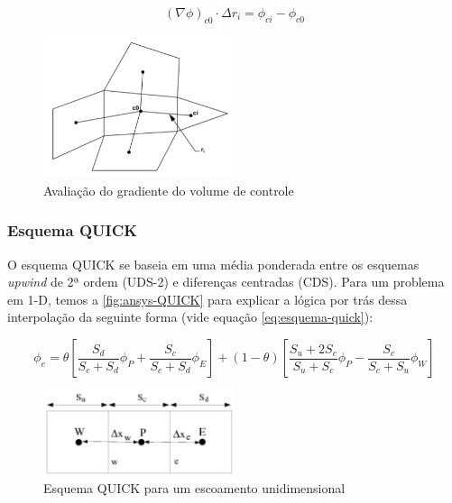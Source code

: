 \begin{equation} \label{eq:gradiente-minimos-quadrados}
    \left(\nabla\phi\right)_{c0} \cdot \Delta r_i = \phi_{ci} - \phi_{c0}
\end{equation}

\begin{figure}[!ht]
	\centering
	\includegraphics[width=0.5\textwidth]{foto02-minimos-quadrados.png}
	\caption{Avaliação do gradiente do volume de controle \cite{fluent2021ansys}}
	\label{fig:minimos-quadrados}
\end{figure}
 
\subsubsection{Esquema QUICK}

O esquema QUICK \cite{Leonard1990} se baseia em uma média ponderada entre os esquemas \textit{upwind} de 2ª ordem (UDS-2) e diferenças centradas (CDS). Para um problema em 1-D, temos a \autoref{fig:ansys-QUICK} para explicar a lógica por trás dessa interpolação da seguinte forma (vide equação \ref{eq:esquema-quick}):

\begin{equation}
	\label{eq:esquema-quick}
	\phi_e = \theta\left[\frac{S_d}{S_c+S_d}\phi_P + \frac{S_c}{S_c+S_d}\phi_E \right] + (1 - \theta)\left[\frac{S_u+2S_c}{S_u+S_c}\phi_P - \frac{S_c}{S_c+S_u}\phi_W \right]
\end{equation}

\begin{figure}[!ht]
	\centering
	\includegraphics[width=0.5\textwidth]{foto03-quick-1d.png}  
	\caption{Esquema QUICK para um escoamento unidimensional \cite{fluent2021ansys}}
	\label{fig:ansys-QUICK}
\end{figure}

